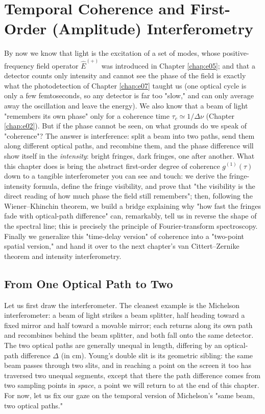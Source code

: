 \chapter{Temporal Coherence and First-Order (Amplitude) Interferometry}
\label{chap:e09}

\begin{chapteropening}
By now we know that light is the excitation of a set of modes, whose positive-frequency field operator \(\hat E^{(+)}\) was introduced in Chapter \ref{chap:e05}; and that a detector counts only intensity and cannot see the phase of the field is exactly what the photodetection of Chapter \ref{chap:e07} taught us (one optical cycle is only a few femtoseconds, so any detector is far too "slow," and can only average away the oscillation and leave the energy). We also know that a beam of light "remembers its own phase" only for a coherence time \(\tau_c\simeq1/\Delta\nu\) (Chapter \ref{chap:e02}). But if the phase cannot be seen, on what grounds do we speak of "coherence"? The answer is interference: split a beam into two paths, send them along different optical paths, and recombine them, and the phase difference will show itself in the \emph{intensity}: bright fringes, dark fringes, one after another. What this chapter does is bring the abstract first-order degree of coherence \(g^{(1)}(\tau)\) down to a tangible interferometer you can see and touch: we derive the fringe-intensity formula, define the fringe visibility, and prove that "the visibility is the direct reading of how much phase the field still remembers"; then, following the Wiener--Khinchin theorem, we build a bridge explaining why "how fast the fringes fade with optical-path difference" can, remarkably, tell us in reverse the shape of the spectral line; this is precisely the principle of Fourier-transform spectroscopy. Finally we generalize this "time-delay version" of coherence into a "two-point spatial version," and hand it over to the next chapter's van Cittert--Zernike theorem and intensity interferometry.
\end{chapteropening}

\section{From One Optical Path to Two}
\label{sec:e09-two-beams}

Let us first draw the interferometer. The cleanest example is the Michelson interferometer: a beam of light strikes a beam splitter, half heading toward a fixed mirror and half toward a movable mirror; each returns along its own path and recombines behind the beam splitter, and both fall onto the same detector. The two optical paths are generally unequal in length, differing by an optical-path difference \(\Delta\) (in cm). Young's double slit is its geometric sibling: the same beam passes through two slits, and in reaching a point on the screen it too has traversed two unequal segments, except that there the path difference comes from two sampling points in \emph{space}, a point we will return to at the end of this chapter. For now, let us fix our gaze on the temporal version of Michelson's "same beam, two optical paths."

